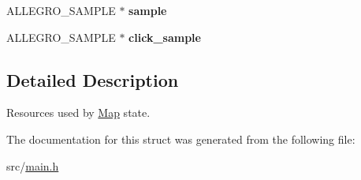\begin{DoxyCompactItemize}
\item 
\hypertarget{structMap_a3334bc47109df8757b77c9d3bf67ec5f}{\-A\-L\-L\-E\-G\-R\-O\-\_\-\-S\-A\-M\-P\-L\-E $\ast$ {\bfseries sample}}\label{structMap_a3334bc47109df8757b77c9d3bf67ec5f}

\item 
\hypertarget{structMap_ab135432a4c01202cff3396e75f11dfea}{\-A\-L\-L\-E\-G\-R\-O\-\_\-\-S\-A\-M\-P\-L\-E $\ast$ {\bfseries click\-\_\-sample}}\label{structMap_ab135432a4c01202cff3396e75f11dfea}

\end{DoxyCompactItemize}


\subsection{\-Detailed \-Description}
\-Resources used by \hyperlink{structMap}{\-Map} state. 

\-The documentation for this struct was generated from the following file\-:\begin{DoxyCompactItemize}
\item 
src/\hyperlink{main_8h}{main.\-h}\end{DoxyCompactItemize}
